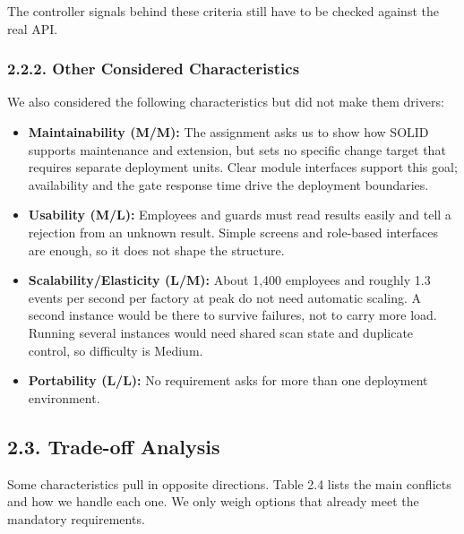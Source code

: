 The controller signals behind these criteria still have to be checked against the real API.

\subsubsection*{2.2.2. Other Considered Characteristics}

{}


We also considered the following characteristics but did not make them drivers:

\begin{itemize}[leftmargin=36pt, itemsep=2pt, topsep=4pt, parsep=2pt]

  \item \textbf{Maintainability (M/M):} The assignment asks us to show how SOLID supports maintenance and extension, but sets no specific change target that requires separate deployment units. Clear module interfaces support this goal; availability and the gate response time drive the deployment boundaries.

  \item \textbf{Usability (M/L):} Employees and guards must read results easily and tell a rejection from an unknown result. Simple screens and role-based interfaces are enough, so it does not shape the structure.

  \item \textbf{Scalability/Elasticity (L/M):} About 1,400 employees and roughly 1.3 events per second per factory at peak do not need automatic scaling. A second instance would be there to survive failures, not to carry more load. Running several instances would need shared scan state and duplicate control, so difficulty is Medium.

  \item \textbf{Portability (L/L):} No requirement asks for more than one deployment environment.

\end{itemize}

\subsection*{2.3. Trade-off Analysis}

{}


Some characteristics pull in opposite directions. Table 2.4 lists the main conflicts and how we handle each one. We only weigh options that already meet the mandatory requirements.

